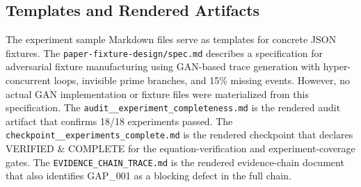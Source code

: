 \subsection{Templates and Rendered Artifacts}
\label{sec:experiments-core-impl-templates}

The experiment sample Markdown files serve as templates for concrete JSON fixtures.
The \texttt{paper-fixture-design/spec.md} describes a specification for adversarial
fixture manufacturing using GAN-based trace generation with hyper-concurrent loops,
invisible prime branches, and 15\% missing events. However, no actual GAN
implementation or fixture files were materialized from this specification. The
\texttt{audit\_\_experiment\_completeness.md} is the rendered audit artifact that
confirms 18/18 experiments passed. The \texttt{checkpoint\_\_experiments\_complete.md}
is the rendered checkpoint that declares VERIFIED \& COMPLETE for the equation-verification
and experiment-coverage gates. The \texttt{EVIDENCE\_CHAIN\_TRACE.md} is the
rendered evidence-chain document that also identifies GAP\_001 as a blocking defect
in the full chain.
